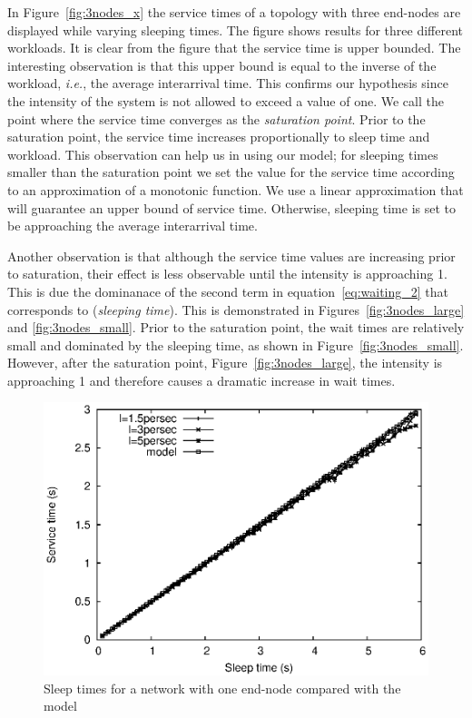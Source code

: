 In Figure~\ref{fig:3nodes_x} the service times of a topology with three end-nodes are displayed while varying sleeping times. The figure shows results for three different workloads. It is clear from the figure that the service time is upper bounded. The interesting observation is that this upper bound is equal to the inverse of the workload, \emph{i.e.}, the average interarrival time. This confirms our hypothesis since the intensity of the system is not allowed to exceed a value of one. We call the point where the service time converges as the \emph{saturation point}. Prior to the saturation point, the service time increases proportionally to sleep time and workload. This observation can help us in using our model; for sleeping times smaller than the saturation point we set the value for the service time according to an approximation of a monotonic function. We use a linear approximation that will guarantee an upper bound of service time. Otherwise, sleeping time is set to be approaching the average interarrival time.

Another observation is that although the service time values are increasing prior to saturation, their effect is less observable until the intensity is approaching 1. This is due the dominanace of the second term in equation~\ref{eq:waiting_2} that corresponds to (\emph{sleeping time}). This is demonstrated in Figures~\ref{fig:3nodes_large} and \ref{fig:3nodes_small}. Prior to the saturation point, the wait times are relatively small and dominated by the sleeping time, as shown in Figure~\ref{fig:3nodes_small}. However, after the saturation point, Figure~\ref{fig:3nodes_large}, the intensity is approaching 1 and therefore causes a dramatic increase in wait times.

\begin{figure}[t]
\centering
\includegraphics[scale=0.65]{figures/1node_varySleep_sim.eps}
\caption{Sleep times for a network with one end-node compared with the model}
\label{fig:1node}
\end{figure}

